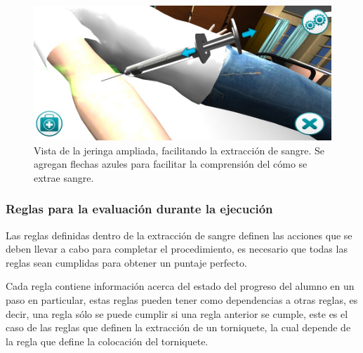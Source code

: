 \begin{figure}
\centering
\includegraphics[scale=0.5]{propuesta/hemocultivo_jeringa_ampliada.jpg}
\caption{Vista de la jeringa ampliada, facilitando la extracción de sangre. Se
    agregan flechas azules para facilitar la comprensión del cómo se extrae
    sangre.}
\label{fig:hemocultivo_jeringa_zoom}
\end{figure}



\subsubsection{Reglas para la evaluación durante la ejecución}



Las reglas definidas dentro de la extracción de sangre definen las acciones
que se deben llevar a cabo para completar el procedimiento, es necesario que
todas las reglas sean cumplidas para obtener un puntaje perfecto.

Cada regla contiene información acerca del estado del progreso del alumno en un
paso en particular, estas reglas pueden tener como dependencias a otras reglas,
es decir, una regla sólo se puede cumplir si una regla anterior se cumple, este
es el caso de las reglas que definen la extracción de un torniquete, la cual
depende de la regla que define la colocación del torniquete.  

